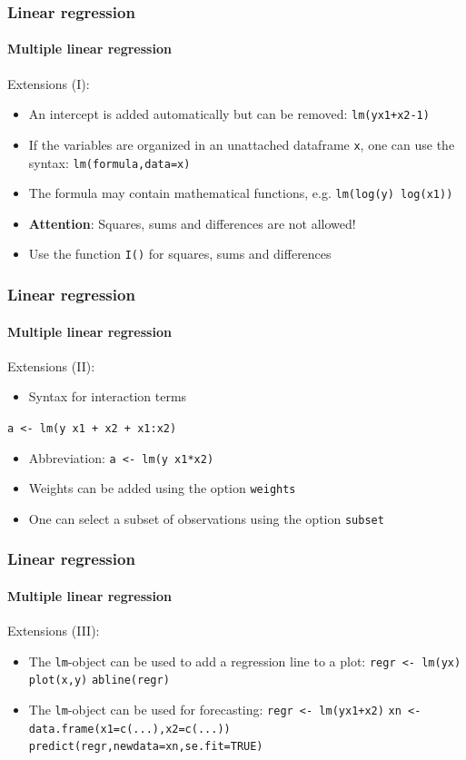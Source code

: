 \documentclass[title={Introduction to R}, author={Mutschler and Zaharieva}, inst={Institute for Econometrics and Empirical Economics}]{beamer}
\begin{document}
\begin{frame}
\frametitle{Linear regression}
\framesubtitle{Multiple linear regression}
Extensions (I):
\begin{itemize}
\item An intercept is added automatically but can be removed: \texttt{lm(yx1+x2-1)}
\item If the variables are organized in an unattached dataframe \texttt{x}, 
\newline
one can use the syntax: \texttt{lm(formula,data=x)}
\item The formula may contain mathematical functions, e.g. \texttt{lm(log(y)%
log(x1))}
\item \textbf{Attention}: Squares, sums and differences are not allowed!
\item Use the function \texttt{I()} for squares, sums and differences
\end{itemize}
\end{frame}


\begin{frame}
\frametitle{Linear regression}
\framesubtitle{Multiple linear regression}
Extensions (II):
\begin{itemize}
\item Syntax for interaction terms
\end{itemize}
\begin{center}
\texttt{a <- lm(y  x1 + x2 + x1:x2)}
\end{center}
\begin{itemize}
\item Abbreviation: \texttt{a <- lm(y  x1*x2)}
\item Weights can be added using the option \texttt{weights}
\item One can select a subset of observations using the option \texttt{subset%
}
\end{itemize}
\end{frame}


\begin{frame}
\frametitle{Linear regression}
\framesubtitle{Multiple linear regression}
Extensions (III):
\begin{itemize}
\item The \texttt{lm}-object can be used to add a regression line to a plot:
\newline
\texttt{regr <- lm(yx)}\newline
\texttt{plot(x,y)}\newline
\texttt{abline(regr)}
\item The \texttt{lm}-object can be used for forecasting:\newline
\texttt{regr <- lm(yx1+x2)}\newline
\texttt{xn <- data.frame(x1=c(...),x2=c(...))}\newline
\texttt{predict(regr,newdata=xn,se.fit=TRUE)}
\end{itemize}
\end{frame}
\end{document}
